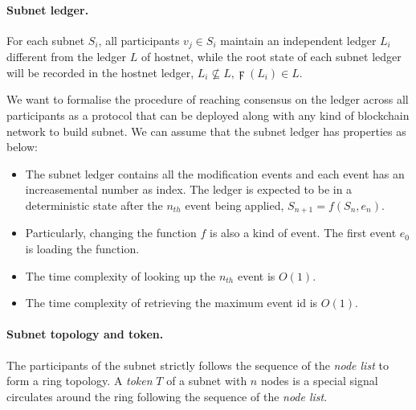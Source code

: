 \documentclass[11pt]{article}
\begin{document}
\paragraph{Subnet ledger.}
For each subnet $S_{i}$, all participants \(v_{j} \in S_{i}\) maintain an independent ledger $L_{i}$ different from the ledger $L$ of hostnet, while the root state of each subnet ledger will be recorded in the hostnet ledger, \( L_{i} \nsubseteq L, \digamma(L_{i}) \in L \).

We want to formalise the procedure of reaching consensus on the ledger across all participants as a protocol that can be deployed along with any kind of blockchain network to build subnet. We can assume that the subnet ledger has properties as below:

\begin{itemize}
\item The subnet ledger contains all the modification events and each event has an increasemental number as index.
The ledger is expected to be in a deterministic state after the $n_{th}$ event being applied, \(S_{n+1} = f(S_{n}, e_{n})\).
\item Particularly, changing the function $f$ is also a kind of event. The first event $e_{0}$ is loading the function.
\item The time complexity of looking up the $n_{th}$ event is $O(1)$.
\item The time complexity of retrieving the maximum event id is $O(1)$.
\end{itemize}


\paragraph{Subnet topology and token.}

The participants of the subnet strictly follows the sequence of the \textit{node list} to form a ring topology.
A \textit{token} $T$ of a subnet with $n$ nodes is a special signal circulates around the ring following the sequence of the \textit{node list}.
\end{document}
